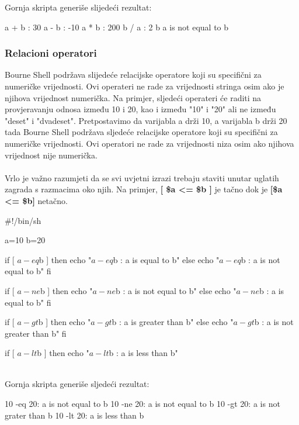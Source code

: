 \documentclass[11pt]{book}
\begin{document}
Gornja skripta generiše slijedeći rezultat:\\

\begin{shortlisting}
a + b : 30
a - b : -10
a * b : 200
b / a : 2
b %
a is not equal to b
\end{shortlisting}

\subsubsection{Relacioni operatori}
Bourne Shell podržava slijedeće relacijske operatore koji su specifični za numeričke vrijednosti. Ovi operateri ne rade za vrijednosti stringa osim ako je njihova vrijednost numerička. Na primjer, sljedeći operateri će raditi na provjeravanju odnosa između 10 i 20, kao i između "10" i "20" ali ne između "deset" i "dvadeset". Pretpostavimo da varijabla a drži 10, a varijabla b drži 20 tada Bourne Shell podržava sljedeće relacijske operatore koji su specifični za numeričke vrijednosti. Ovi operatori ne rade za vrijednosti niza osim ako njihova vrijednost nije numerička.\\

\\
    
Vrlo je važno razumjeti da se svi uvjetni izrazi trebaju staviti unutar uglatih zagrada s razmacima oko njih. Na primjer, \textbf{[ \$a <= \$b ]} je tačno dok je \textbf{[\$a <= \$b]} netačno.\\

\begin{shortlisting}
#!/bin/sh

a=10
b=20

if [ $a -eq $b ]
then
    echo "$a -eq $b : a is equal to b"
else
    echo "$a -eq $b : a is not equal to b"
fi

if [ $a -ne $b ]
then
    echo "$a -ne $b : a is not equal to b"
else
    echo "$a -ne $b : a is equal to b"
fi

if [ $a -gt $b ]
then 
    echo "$a -gt $b : a is greater than b"
else 
    echo "$a -gt $b : a is not greater than b"
fi

if [ $a -lt $b ]
then
    echo "$a -lt $b : a is less than b"
\end{shortlisting}\\

Gornja skripta generiše sljedeći rezultat:\\

\begin{shortlisting}
10 -eq 20: a is not equal to b
10 -ne 20: a is not equal to b
10 -gt 20: a is not grater than b
10 -lt 20: a is less than b
\end{shortlisting}
\end{document}

